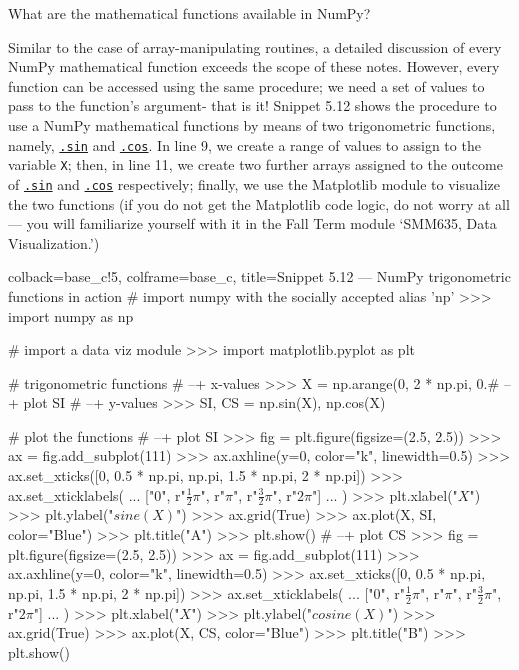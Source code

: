 \documentclass[a4paper,11pt]{book}
\newcommand{\question}[1]{%
    \begin{tcolorbox}[colback=comp_c!10,colframe=comp_c,sidebyside align=top,width=\linewidth,before skip=1ex]
        #1
    \end{tcolorbox}
    \switchcolumn%
}
\newcommand{\note}[1]{%
    \begin{tcolorbox}[colback=white!0,colframe=white!10,width=\linewidth,before skip=1ex]
        #1
    \end{tcolorbox}
}
\begin{document}
\begin{paracol}{2}
\question{\raggedright What are the mathematical functions available in NumPy?}
\note{
Similar to the case of array-manipulating routines, a detailed discussion of every NumPy mathematical function exceeds the scope of these notes. However, every function can be accessed using the same procedure; we need a set of values to pass to the function's argument- that is it! Snippet 5.12 shows the procedure to use a NumPy mathematical functions by means of two trigonometric functions, namely, \href{https://numpy.org/doc/stable/reference/generated/numpy.sin.html\#numpy.sin}{\texttt{.sin}} and \href{https://numpy.org/doc/stable/reference/generated/numpy.cos.html\#numpy.cos}{\texttt{.cos}}. In line 9, we create a range of values to assign to the variable \texttt{X}; then, in line 11, we create two further arrays assigned to the outcome of \href{https://numpy.org/doc/stable/reference/generated/numpy.sin.html\#numpy.sin}{\texttt{.sin}} and \href{https://numpy.org/doc/stable/reference/generated/numpy.cos.html\#numpy.cos}{\texttt{.cos}} respectively; finally, we use the Matplotlib module to visualize the two functions (if you do not get the Matplotlib code logic, do not worry at all --- you will familiarize yourself with it in the Fall Term module `SMM635, Data Visualization.')}
\end{paracol}

\begin{pythoncode}[linenos=true,]{colback=base_c!5, colframe=base_c, title=\sffamily Snippet 5.12 --- NumPy trigonometric functions in action}
# import numpy with the socially accepted alias 'np'
>>> import numpy as np

# import a data viz module
>>> import matplotlib.pyplot as plt

# trigonometric functions
# --+ x-values
>>> X = np.arange(0, 2 * np.pi, 0.# --+ plot SI 
# --+ y-values
>>> SI, CS = np.sin(X), np.cos(X)

# plot the functions
# --+ plot SI 
>>> fig = plt.figure(figsize=(2.5, 2.5))
>>> ax = fig.add_subplot(111)
>>> ax.axhline(y=0, color="k", linewidth=0.5)
>>> ax.set_xticks([0, 0.5 * np.pi, np.pi, 1.5 * np.pi, 2 * np.pi])
>>> ax.set_xticklabels(
...     ["0", r"$\frac{1}{2} \pi$", r"$\pi$", r"$\frac{3}{2} \pi$", r"$2 \pi$"]
... )
>>> plt.xlabel("$X$")
>>> plt.ylabel("$sine(X)$")
>>> ax.grid(True)
>>> ax.plot(X, SI, color="Blue")
>>> plt.title("A")
>>> plt.show() 
# --+ plot CS 
>>> fig = plt.figure(figsize=(2.5, 2.5))
>>> ax = fig.add_subplot(111)
>>> ax.axhline(y=0, color="k", linewidth=0.5)
>>> ax.set_xticks([0, 0.5 * np.pi, np.pi, 1.5 * np.pi, 2 * np.pi])
>>> ax.set_xticklabels(
...     ["0", r"$\frac{1}{2} \pi$", r"$\pi$", r"$\frac{3}{2} \pi$", r"$2 \pi$"]
... )
>>> plt.xlabel("$X$")
>>> plt.ylabel("$cosine(X)$")
>>> ax.grid(True)
>>> ax.plot(X, CS, color="Blue")
>>> plt.title("B")
>>> plt.show()
\end{pythoncode}
\end{document}
